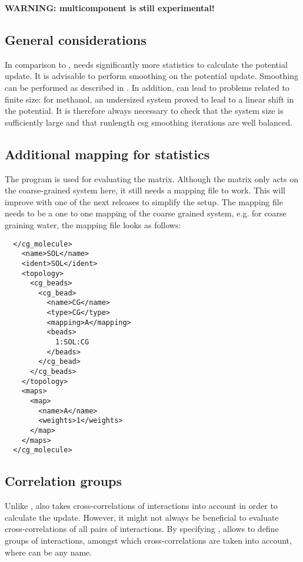 \textbf{WARNING: multicomponent \imc is still experimental!}

\subsection{General considerations}
In comparison to \ibi, \imc needs significantly more statistics to calculate the potential update\cite{Ruehle:2009.a}. It is advisable to perform smoothing on the potential update. Smoothing can be performed as described in . In addition, \imc can lead to problems related to finite size: for methanol, an undersized system proved to lead to a linear shift in the potential\cite{Ruehle:2009.a}. It is therefore always necessary to check that the system size is sufficiently large and that runlength csg smoothing iterations are well balanced.

\subsection{Additional mapping for statistics}
The program  is used for evaluating the \imc matrix. Although the matrix only acts on the coarse-grained system here, it still needs a mapping file to work. This will improve with one of the next releases to simplify the setup. The mapping file needs to be a one to one mapping of the coarse grained system, e.g. for coarse graining \spce water, the mapping file looks as follows:
\begin{lstlisting}
  </cg_molecule>
    <name>SOL</name> 
    <ident>SOL</ident>
    <topology>
      <cg_beads>
        <cg_bead>
          <name>CG</name>
          <type>CG</type>
          <mapping>A</mapping>
          <beads>
            1:SOL:CG 
          </beads>
        </cg_bead>
      </cg_beads>
    </topology>
    <maps>
      <map>
        <name>A</name>
        <weights>1</weights>
      </map>
    </maps>
  </cg_molecule>
\end{lstlisting}

\subsection{Correlation groups}
Unlike \ibi, \imc also takes cross-correlations of interactions into account in order to calculate the update. However, it might not always be beneficial to evaluate cross-correlations of all pairs of interactions. By specifying , \votca allows to define groups of interactions, amongst which cross-correlations are taken into account, where  can be any name.

